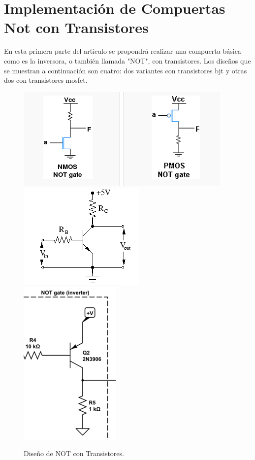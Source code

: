 \section{Implementación de Compuertas Not con Transistores}

En esta primera parte del artículo se propondrá realizar una compuerta
básica como es la inversora, o también llamada "NOT", con transistores.
Los diseños que se muestran a continuación son cuatro: dos variantes
con transistores bjt y otras dos con transistores mosfet.

\begin{figure}[H]
\begin{centering}
\includegraphics[scale=0.5]{mosNOT.PNG}
\qquad
\includegraphics[scale=0.5]{npnNOT.PNG}
\qquad
\includegraphics[scale=0.5]{pnpNOT.PNG}
\qquad
\par\end{centering}
\caption{Diseño de NOT con Transistores.}

\end{figure}

